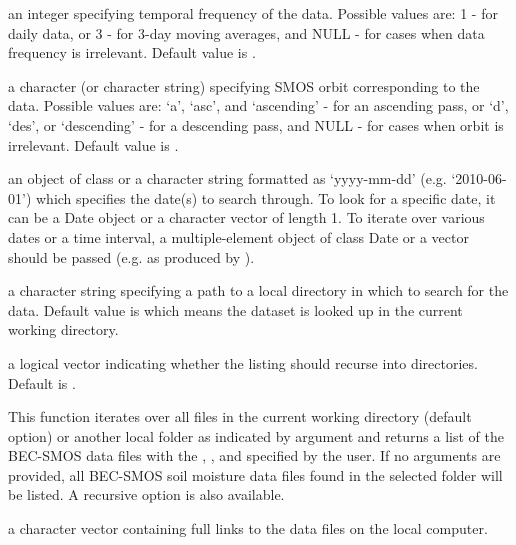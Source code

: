 \documentclass[a4paper]{book}
\begin{document}
%
\begin{Arguments}
\begin{ldescription}
\item[\code{freq}] an integer specifying temporal frequency of the data. Possible
values are: 1 - for daily data, or 3 - for 3-day moving averages, and NULL -
for cases when data frequency is irrelevant. Default value is .

\item[\code{orbit}] a character (or character string) specifying SMOS orbit
corresponding to the data. Possible values are: ‘a’, ‘asc’, and ‘ascending’ -
for an ascending pass, or ‘d’, ‘des’, or ‘descending’ - for a descending
pass, and NULL - for cases when orbit is irrelevant. Default value is
.

\item[\code{dates}] an object of class  or a character string formatted
as ‘yyyy-mm-dd’ (e.g. ‘2010-06-01’) which specifies the date(s) to search
through. To look for a specific date, it can be a Date object or a character
vector of length 1. To iterate over various dates or a time interval, a
multiple-element object of class Date or a vector should be passed (e.g. as
produced by ).

\item[\code{dir}] a character string specifying a path to a local directory in which
to search for the data. Default value is  which means the dataset
is looked up in the current working directory.

\item[\code{recursive}] a logical vector indicating whether the listing should
recurse into directories. Default is .
\end{ldescription}
\end{Arguments}
%
\begin{Details}
This function iterates over all files in the current working directory
(default option) or another local folder as indicated by  argument
and returns a list of the BEC-SMOS data files with the ,
, and  specified by the user. If no arguments are
provided, all BEC-SMOS soil moisture data files found in the selected folder
will be listed. A recursive option is also available.
\end{Details}
%
\begin{Value}
a character vector containing full links to the data files on the
local computer.
\end{Value}
\end{document}
